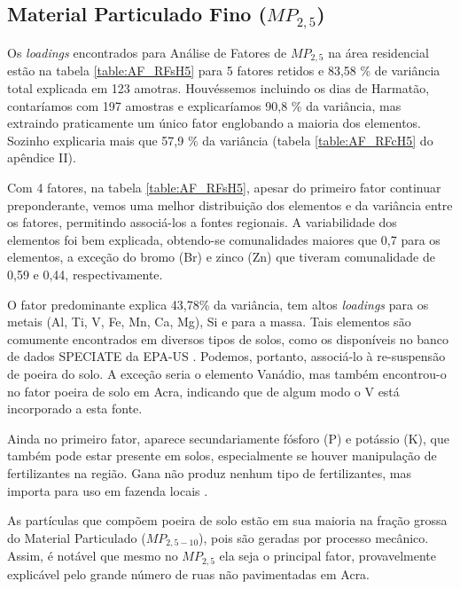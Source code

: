 \subsection{Material Particulado Fino ($MP_{2,5}$)}

Os \textit{loadings} encontrados para Análise de Fatores de $MP_{2,5}$
na área residencial estão na tabela \ref{table:AF_RFsH5} para 5 fatores retidos
e 83,58 \% de variância total explicada em 123 amotras. 
Houvéssemos incluindo os dias de Harmatão, contaríamos com 197 amostras e 
explicaríamos 90,8 \% da variância, mas extraindo praticamente um único fator 
englobando a maioria dos elementos. Sozinho explicaria mais que 57,9 \% da 
variância (tabela \ref{table:AF_RFcH5} do apêndice II).

Com 4 fatores, na tabela \ref{table:AF_RFsH5}, apesar do primeiro fator 
continuar preponderante, vemos uma melhor distribuição dos elementos e da 
variância entre os fatores, permitindo associá-los a fontes regionais.
A variabilidade dos elementos foi bem explicada, obtendo-se comunalidades 
maiores que 0,7 para os elementos, a exceção do bromo (Br) e zinco (Zn) que 
tiveram comunalidade de 0,59 e 0,44, respectivamente.

O fator predominante explica 43,78\% da variância, tem altos \textit{loadings} 
para os metais (Al, Ti, V, Fe, Mn, Ca, Mg), Si e para a massa. Tais elementos 
são comumente encontrados em diversos tipos de solos, como os disponíveis no 
banco de dados SPECIATE da EPA-US \citep{simon2010}. Podemos, portanto, 
associá-lo à re-suspensão de poeira do solo. A exceção seria o elemento Vanádio,
mas \citet{aboh2009} também encontrou-o no fator poeira de solo em Acra, 
indicando que de algum modo o V está incorporado a esta fonte.

Ainda no primeiro fator, aparece secundariamente fósforo (P) e potássio (K), 
que também pode estar presente em solos, especialmente se houver manipulação 
de fertilizantes na região. Gana não produz nenhum tipo de fertilizantes,
mas importa para uso em fazenda locais \citep{fianko2011}. 

As partículas que compõem poeira de solo estão em sua maioria na fração
grossa do Material Particulado ($MP_{2,5-10}$), pois são geradas por processo 
mecânico. Assim, é notável que mesmo no $MP_{2,5}$ ela seja o principal fator, 
provavelmente explicável pelo grande número de ruas não pavimentadas em Acra. 

